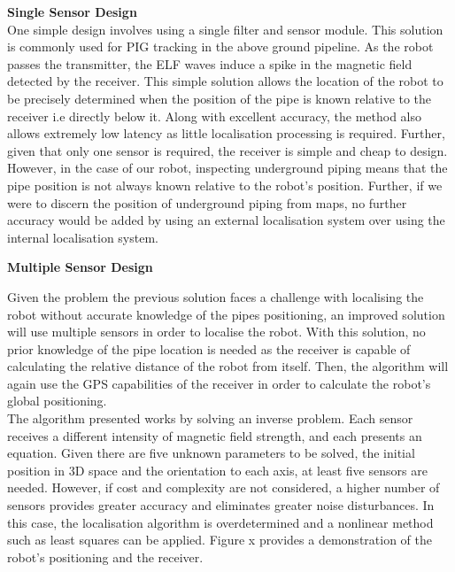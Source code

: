 \documentclass[11pt]{article}		%
\begin{document}
			\textbf{Single Sensor Design}\\
			One simple design involves using a single filter and sensor module. This solution is commonly used for PIG tracking in the above ground pipeline. As the robot passes the transmitter, the ELF waves induce a spike in the magnetic field detected by the receiver. This simple solution allows the location of the robot to be precisely determined when the position of the pipe is known relative to the receiver i.e directly below it. Along with excellent accuracy, the method also allows extremely low latency as little localisation processing is required. Further, given that only one sensor is required, the receiver is simple and cheap to design. \\
	    	\hspace*{3ex}However, in the case of our robot, inspecting underground piping means that the pipe position is not always known relative to the robot's position. Further, if we were to discern the position of underground piping from maps, no further accuracy would be added by using an external localisation system over using the internal localisation system. 
	
	        \textbf{Multiple Sensor Design}
			
			Given the problem the previous solution faces a challenge with localising the robot without accurate knowledge of the pipes positioning, an improved solution will use multiple sensors in order to localise the robot. With this solution, no prior knowledge of the pipe location is needed as the receiver is capable of calculating the relative distance of the robot from itself. Then, the algorithm will again use the GPS capabilities of the receiver in order to calculate the robot's global positioning. \\
			
			\hspace*{3ex}The algorithm presented works by solving an inverse problem. Each sensor receives a different intensity of magnetic field strength, and each presents an equation. Given there are five unknown parameters to be solved, the initial position in 3D space and the orientation to each axis, at least five sensors are needed. However, if cost and complexity are not considered, a higher number of sensors provides greater accuracy and eliminates greater noise disturbances. In this case, the localisation algorithm is overdetermined and a nonlinear method such as least squares can be applied. Figure x provides a demonstration of the robot's positioning and the receiver.\\
			
\end{document}
